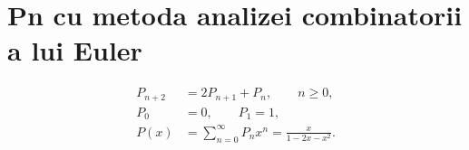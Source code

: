 \documentclass[a4paper,11pt]{article}
\theoremstyle{plain}
\theoremstyle{definition}
\theoremstyle{remark}
\begin{document}
\section{Pn cu metoda analizei combinatorii a lui Euler}
\[
\begin{aligned}
P_{n+2} &= 2P_{n+1}+P_n, \qquad n\ge 0,\\
P_0 &= 0, \qquad P_1=1,\\
P(x) &= \sum_{n=0}^{\infty} P_n x^n
      = \frac{x}{1-2x-x^2}.
\end{aligned}
\]
\end{document}
